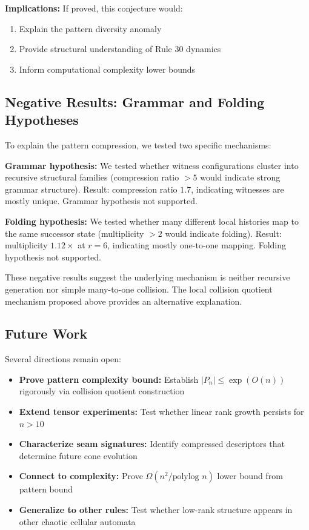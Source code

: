 \documentclass[11pt]{article}
\begin{document}
\textbf{Implications:} If proved, this conjecture would:
\begin{enumerate}
    \item Explain the pattern diversity anomaly
    \item Provide structural understanding of Rule 30 dynamics
    \item Inform computational complexity lower bounds
\end{enumerate}

\subsection{Negative Results: Grammar and Folding Hypotheses}

To explain the pattern compression, we tested two specific mechanisms:

\textbf{Grammar hypothesis:} We tested whether witness configurations cluster into recursive structural families (compression ratio $> 5$ would indicate strong grammar structure). Result: compression ratio $1.7$, indicating witnesses are mostly unique. Grammar hypothesis not supported.

\textbf{Folding hypothesis:} We tested whether many different local histories map to the same successor state (multiplicity $> 2$ would indicate folding). Result: multiplicity $1.12\times$ at $r=6$, indicating mostly one-to-one mapping. Folding hypothesis not supported.

These negative results suggest the underlying mechanism is neither recursive generation nor simple many-to-one collision. The local collision quotient mechanism proposed above provides an alternative explanation.

\subsection{Future Work}

Several directions remain open:

\begin{itemize}
    \item \textbf{Prove pattern complexity bound:} Establish $|P_n| \leq \exp(O(n))$ rigorously via collision quotient construction
    \item \textbf{Extend tensor experiments:} Test whether linear rank growth persists for $n > 10$
    \item \textbf{Characterize seam signatures:} Identify compressed descriptors that determine future cone evolution
    \item \textbf{Connect to complexity:} Prove $\Omega(n^2/\text{polylog } n)$ lower bound from pattern bound
    \item \textbf{Generalize to other rules:} Test whether low-rank structure appears in other chaotic cellular automata
\end{itemize}
\end{document}

